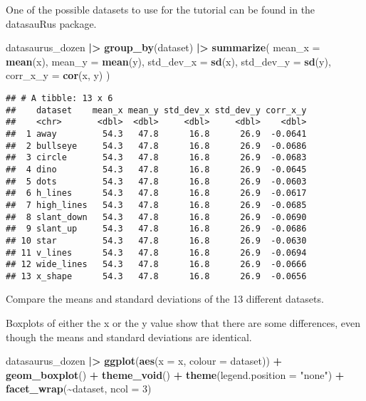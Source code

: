 \documentclass[
]{article}
\newenvironment{Shaded}{\begin{snugshade}}{\end{snugshade}}
\newcommand{\AttributeTok}[1]{\textcolor[rgb]{0.13,0.29,0.53}{#1}}
\newcommand{\DecValTok}[1]{\textcolor[rgb]{0.00,0.00,0.81}{#1}}
\newcommand{\FunctionTok}[1]{\textcolor[rgb]{0.13,0.29,0.53}{\textbf{#1}}}
\newcommand{\NormalTok}[1]{#1}
\newcommand{\SpecialCharTok}[1]{\textcolor[rgb]{0.81,0.36,0.00}{\textbf{#1}}}
\newcommand{\StringTok}[1]{\textcolor[rgb]{0.31,0.60,0.02}{#1}}
\begin{document}
One of the possible datasets to use for the tutorial can be found in the
datasauRus package.

\begin{Shaded}
\begin{Highlighting}[]
\NormalTok{datasaurus\_dozen }\SpecialCharTok{|\textgreater{}} 
  \FunctionTok{group\_by}\NormalTok{(dataset) }\SpecialCharTok{|\textgreater{}} 
  \FunctionTok{summarize}\NormalTok{(}
      \AttributeTok{mean\_x    =} \FunctionTok{mean}\NormalTok{(x),}
      \AttributeTok{mean\_y    =} \FunctionTok{mean}\NormalTok{(y),}
      \AttributeTok{std\_dev\_x =} \FunctionTok{sd}\NormalTok{(x),}
      \AttributeTok{std\_dev\_y =} \FunctionTok{sd}\NormalTok{(y),}
      \AttributeTok{corr\_x\_y  =} \FunctionTok{cor}\NormalTok{(x, y)}
\NormalTok{      )}
\end{Highlighting}
\end{Shaded}

\begin{verbatim}
## # A tibble: 13 x 6
##    dataset    mean_x mean_y std_dev_x std_dev_y corr_x_y
##    <chr>       <dbl>  <dbl>     <dbl>     <dbl>    <dbl>
##  1 away         54.3   47.8      16.8      26.9  -0.0641
##  2 bullseye     54.3   47.8      16.8      26.9  -0.0686
##  3 circle       54.3   47.8      16.8      26.9  -0.0683
##  4 dino         54.3   47.8      16.8      26.9  -0.0645
##  5 dots         54.3   47.8      16.8      26.9  -0.0603
##  6 h_lines      54.3   47.8      16.8      26.9  -0.0617
##  7 high_lines   54.3   47.8      16.8      26.9  -0.0685
##  8 slant_down   54.3   47.8      16.8      26.9  -0.0690
##  9 slant_up     54.3   47.8      16.8      26.9  -0.0686
## 10 star         54.3   47.8      16.8      26.9  -0.0630
## 11 v_lines      54.3   47.8      16.8      26.9  -0.0694
## 12 wide_lines   54.3   47.8      16.8      26.9  -0.0666
## 13 x_shape      54.3   47.8      16.8      26.9  -0.0656
\end{verbatim}

Compare the means and standard deviations of the 13 different datasets.

Boxplots of either the x or the y value show that there are some
differences, even though the means and standard deviations are
identical.

\begin{Shaded}
\begin{Highlighting}[]
\NormalTok{datasaurus\_dozen }\SpecialCharTok{|\textgreater{}}
  \FunctionTok{ggplot}\NormalTok{(}\FunctionTok{aes}\NormalTok{(}\AttributeTok{x =}\NormalTok{ x, }\AttributeTok{colour =}\NormalTok{ dataset)) }\SpecialCharTok{+}
    \FunctionTok{geom\_boxplot}\NormalTok{() }\SpecialCharTok{+}
    \FunctionTok{theme\_void}\NormalTok{() }\SpecialCharTok{+}
    \FunctionTok{theme}\NormalTok{(}\AttributeTok{legend.position =} \StringTok{"none"}\NormalTok{) }\SpecialCharTok{+}
    \FunctionTok{facet\_wrap}\NormalTok{(}\SpecialCharTok{\textasciitilde{}}\NormalTok{dataset, }\AttributeTok{ncol =} \DecValTok{3}\NormalTok{)}
\end{Highlighting}
\end{Shaded}
\end{document}
